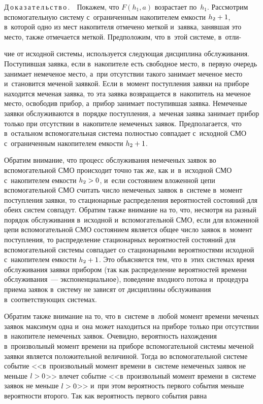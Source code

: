 \begin{multicols}{2}
\smallskip

\noindent
Д\,о\,к\,а\,з\,а\,т\,е\,л\,ь\,с\,т\,в\,о\,.\ \ Покажем, что $F(h_1,a)$ воз\-рас\-та\-ет 
по~$h_1$. Рассмотрим вспомогательную сис\-те\-му с~ограниченным накопителем 
емкости $h_2\hm+1$, в~которой одно из мест накопителя отмечено мет\-кой 
и~заявка, занявшая это место, также отмечается меткой. Предположим, что 
в~этой сис\-те\-ме, в~отли-\linebreak\vspace*{-12pt}

\columnbreak

\noindent
чие от исходной сис\-те\-мы, используется  
сле\-ду\-ющая дисциплина обслуживания. Поступившая заявка, если 
в~накопителе есть свободное место, в~первую очередь занимает немеченое 
место, а~при отсутствии такого занимает меченое место и~становится меченой 
заявкой. Если в~момент по\-ступ\-ле\-ния заявки на приборе находится меченая 
заявка, то эта заявка возвращается в~накопитель на меченое мес\-то, освободив 
прибор, а~прибор занимает по\-сту\-пив\-шая заявка. Немеченые заявки 
обслуживаются в~порядке по\-ступ\-ле\-ния, а~меченая заявка занимает прибор 
только при отсутствии в~накопителе немеченых заявок. Предполагается, что 
в~остальном вспомогательная сис\-те\-ма пол\-ностью совпадает с~исходной 
СМО с~ограниченным накопителем ем\-кости $h_2\hm+1$. 

  Обратим внимание, что процесс обслуживания немеченых заявок во 
вспомогательной СМО происходит точ\-но так же, как и~в~исходной СМО 
с~накопителем ем\-кости $h_2\hm>0$, и~если со\-сто\-яни\-ем вложенной цепи 
вспомогательной СМО считать чис\-ло немеченых заявок в~сис\-те\-ме в~момент 
по\-ступ\-ле\-ния заявки, то стационарные распределения вероятностей  
со\-сто\-яний для обеих сис\-тем совпадут. Обратим также внимание на то, что, 
не\-смот\-ря на разный порядок обслуживания в~исходной и~вспомогательной 
СМО, если для вложенной цепи вспомогательной СМО со\-сто\-яни\-ем 
является общее чис\-ло заявок в~момент поступления, то распределение 
стационарных вероятностей со\-сто\-яний для вспомогательной сис\-те\-мы 
совпадает со стационарными вероятностями исходной с~накопителем ем\-кости 
$h_2\hm+1$. Это объясняется тем, что в~этих сис\-те\-мах время обслуживания 
заявки прибором (так как распределение вероятностей времени  
обслуживания~--- экспоненциальное), поведение входного потока и~процедура 
приема заявок в~сис\-те\-му не зависят от дисциплины обслуживания 
в~со\-от\-вет\-ст\-ву\-ющих сис\-те\-мах.  
  
  Обратим также внимание на то, что в~сис\-те\-ме в~любой момент времени 
меченых заявок максимум одна и~она может находиться на приборе только при 
отсутствии в~накопителе немеченых заявок. Очевидно, ве\-ро\-ят\-ность 
на\-хож\-де\-ния в~произвольный момент времени на приборе вспомогательной 
сис\-те\-мы меченой 
заявки является положительной величиной. Тогда во вспомогательной сис\-те\-ме 
событие <<в~произвольный момент времени в~сис\-те\-ме немеченых заявок не 
меньше $l\hm>0$>> влечет событие <<в~произвольный момент времени 
в~сис\-те\-ме заявок не меньше $l\hm>0$>> и~при этом ве\-ро\-ят\-ность первого 
события меньше ве\-ро\-ят\-ности второго. Так как вероятность первого события 
рав\-на 


\end{multicols}
